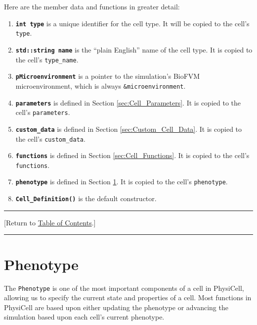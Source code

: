 \documentclass[12pt]{article}
\renewcommand{\v}{\verb}
\newcommand{\smallcode}[1]{\textbf{\texttt{#1}}}
\newcommand{\blue}[1]{\textcolor{blue}{#1}}
\newcommand{\DONE}{}%
\newcommand{\TOClink}{\begin{center}\hrule\vskip-10pt\phantom{.}\hfill[Return to \hyperlink{TOC}{Table of Contents}.]\hfill\phantom{.}\vskip3pt\hrule\end{center}}
\begin{document}
Here are the member data and functions in greater detail: 
\begin{enumerate}
\item
\smallcode{int type} is a unique identifier for the cell type. 
It will be copied to the cell's \v|type|. 

\item 
\smallcode{std::string name} is the ``plain English'' name of the 
cell type. It is copied to the cell's \v|type_name|. 

\item 
\smallcode{pMicroenvironment} is a pointer to the simulation's 
BioFVM microenvironment, which is always \v|&microenvironment|. 

\item 
\smallcode{parameters} is defined in Section 
\ref{sec:Cell_Parameters}.  It is copied to the cell's \v|parameters|. 

\item 
\smallcode{custom\_data} is defined in Section \ref{sec:Custom_Cell_Data}. 
It is copied to the cell's \v|custom_data|. 

\item 
\smallcode{functions} is defined in Section \ref{sec:Cell_Functions}. 
It is copied to the cell's \v|functions|. 

\item 
\smallcode{phenotype} is defined in Section \ref{sec:Phenotype}. It is 
copied to the cell's \v|phenotype|. 

\item
\smallcode{Cell\_Definition()} is the default constructor. 
\end{enumerate}

\TOClink 

\section{Phenotype \DONE}
\label{sec:Phenotype}
The \v|Phenotype| is one of the most important 
components of a cell in PhysiCell, allowing us to 
specify the current state and properties of a cell. 
Most functions in PhysiCell are based upon either updating 
the phenotype or advancing the simulation based upon each cell's 
current phenotype. 
\end{document}
